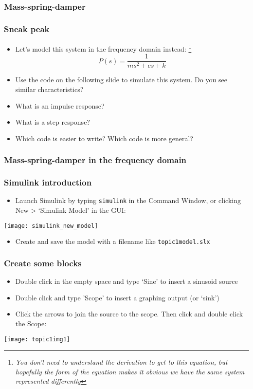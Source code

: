 \documentclass[9pt]{beamer-control}
\begin{document}
\begin{frame}
\frametitle{Mass-spring-damper}
\end{frame}

\begin{frame}
\frametitle{Sneak peak}
\begin{itemize}
\item Let's model this system in the frequency domain instead:%
\footnote{\emph{You don't need to understand the derivation to get to this equation, but hopefully the form of the equation makes it obvious we have the same system represented differently}}
\[
  P(s) = \frac{1}{ms^2+cs+k}
\]
\item Use the code on the following slide to simulate this system. Do you see similar characteristics?
\item What is an impulse response?
\item What is a step response?
\item Which code is easier to write? Which code is more general?
\end{itemize}
\end{frame}

\begin{frame}
\frametitle{Mass-spring-damper in the frequency domain}
\end{frame}


\begin{frame}
\frametitle{Simulink introduction}
\begin{itemize}
\item Launch Simulink by typing \texttt{simulink} in the Command Window, or clicking New > `Simulink Model' in the GUI:
\end{itemize}
\begin{center}
\texttt{[image: simulink\_new\_model]}
\end{center}
\begin{itemize}
\item
Create and save the model with a filename like \texttt{topic1model.slx}
\end{itemize}

\end{frame}

\begin{frame}
\frametitle{Create some blocks}
\begin{itemize}
\item Double click in the empty space and type `Sine' to insert a sinusoid source
\item Double click and type 'Scope' to insert a graphing output (or `sink')
\item Click the arrows to join the source to the scope. Then click  and double click the Scope:
\end{itemize}

\centering
\texttt{[image: topic1img1]}

\end{frame}
\end{document}
